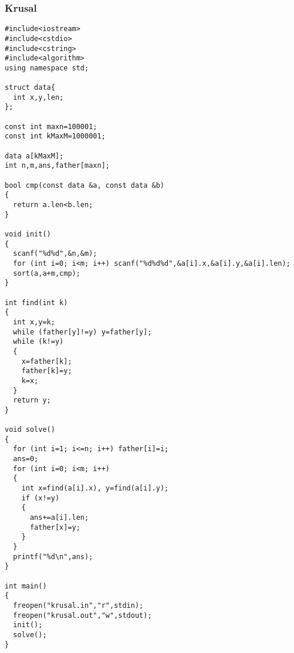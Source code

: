 \subsubsection{Krusal}

\begin{verbatim}
#include<iostream>
#include<cstdio>
#include<cstring>
#include<algorithm>
using namespace std;

struct data{
  int x,y,len;
};

const int maxn=100001;
const int kMaxM=1000001;

data a[kMaxM];
int n,m,ans,father[maxn];

bool cmp(const data &a, const data &b)
{
  return a.len<b.len;
}

void init()
{
  scanf("%d%d",&n,&m);
  for (int i=0; i<m; i++) scanf("%d%d%d",&a[i].x,&a[i].y,&a[i].len);
  sort(a,a+m,cmp);
}

int find(int k)
{
  int x,y=k;
  while (father[y]!=y) y=father[y];
  while (k!=y)
  {
    x=father[k];
    father[k]=y;
    k=x;
  }
  return y;
}

void solve()
{
  for (int i=1; i<=n; i++) father[i]=i;
  ans=0;
  for (int i=0; i<m; i++)
  {
    int x=find(a[i].x), y=find(a[i].y);
    if (x!=y)
    {
      ans+=a[i].len;
      father[x]=y;
    }
  }
  printf("%d\n",ans);
}

int main()
{
  freopen("krusal.in","r",stdin);
  freopen("krusal.out","w",stdout);
  init();
  solve();
}
\end{verbatim}
